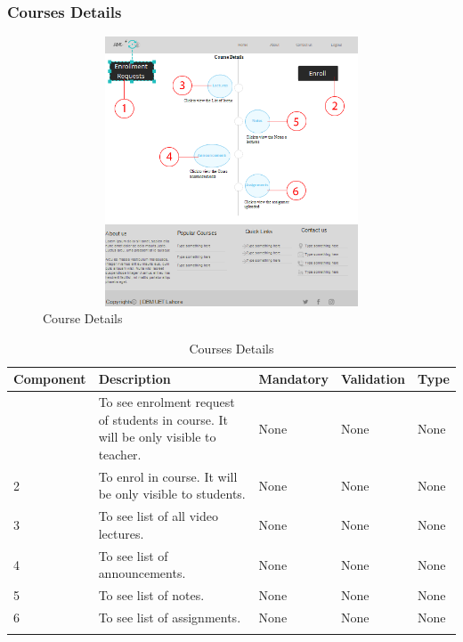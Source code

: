 \documentclass[12pt]{article}
\begin{document}
\subsubsection{Courses Details}
\begin{figure}[h]
  \centering
  \includegraphics[width=12cm, height=8cm]{CourseDetails}
  \caption{Course Details}
\end{figure}

\newpage

\begin{longtable}{|>{\raggedright\arraybackslash}p{2.5cm}|>{\raggedright\arraybackslash}p{2.5cm}|>{\raggedright\arraybackslash}p{2.5cm}|>{\raggedright\arraybackslash}p{2cm}|>{\raggedright\arraybackslash}p{2cm}|}
\hline
\textbf{Component} & \textbf{Description} & \textbf{Mandatory} & \textbf{Validation} & \textbf{Type}\\
\hline
1 &
To see enrolment request of students in course. It will be only visible to teacher. &
None &
None &
None\\
\hline

2 &
To enrol in course. It will be only visible to students. &
None&
None &
None \\
\hline

3 &
To see list of all video lectures. &
None &
None &
None \\
\hline

4 &
To see list of announcements. &
None &
None &
None \\
\hline

5 &
To see list of notes. &
None &
None &
None \\
\hline

6 &
To see list of assignments. &
None &
None &
None \\
\hline

\caption{Courses Details}
\end{longtable}
\end{document}
